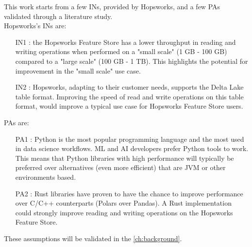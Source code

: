 This work starts from a few \glspl{IN}, provided by Hopsworks, and a few \glspl{PA} validated through a literature study. \\ Hopsworks's \glspl{IN} are:
\begin{itemize}
    \item[IN1 :] the Hopsworks Feature Store has a lower throughput in reading and writing operations when performed on a "small scale" (1 GB - 100 GB) compared to a "large scale" (100 GB - 1 TB). This highlights the potential for improvement in the "small scale" use case.
    \item[IN2 :] Hopsworks, adapting to their customer needs, supports the Delta Lake table format. Improving the speed of read and write operations on this table format, would improve a typical use case for Hopsworks Feature Store users.
\end{itemize}
\glspl{PA} are:
\begin{itemize}
    \item[PA1 :] Python is the most popular programming language and the most used in data science workflows. \gls{ML} and \gls{AI} developers prefer Python tools to work. This means that Python libraries with high performance will typically be preferred over alternatives (even more efficient) that are \gls{JVM} or other environments based.
    \item[PA2 :] Rust libraries have proven to have the chance to improve performance over C/C++ counterparts (Polars over Pandas). A Rust implementation could strongly improve reading and writing operations on the Hopsworks Feature Store.
\end{itemize}
These assumptions will be validated in the \ref{ch:background}. 

